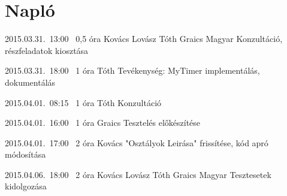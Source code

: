 %
\pagebreak
\section{Napló}

\begin{naplo}

\bejegyzes
{2015.03.31.~13:00~} %
{0,5 óra} %
{Kovács\newline
Lovász\newline
Tóth\newline
Graics\newline
Magyar
} %
{Konzultáció, részfeladatok kiosztása} %

\bejegyzes
{2015.03.31.~18:00~}
{1 óra}
{Tóth}
{Tevékenység: MyTimer implementálás, dokumentálás}

\bejegyzes
{2015.04.01.~08:15~} %
{1 óra} %
{Tóth} %
{Konzultáció} %

\bejegyzes
{2015.04.01.~16:00~} %
{1 óra} %
{Graics} %
{Tesztelés előkészítése} %

\bejegyzes
{2015.04.01.~17:00~} %
{2 óra} %
{Kovács} %
{"Osztályok Leirása" frissítése, kód apró módosítása} %

\bejegyzes
{2015.04.06.~18:00~} %
{2 óra} %
{Kovács\newline
Lovász\newline
Tóth\newline
Graics\newline
Magyar} %
{Tesztesetek kidolgozása} %

\end{naplo}

